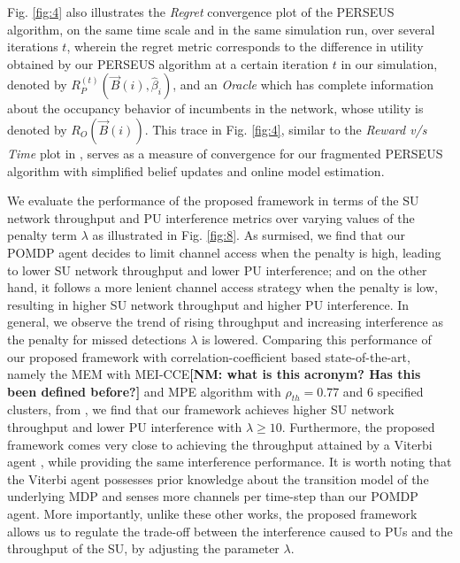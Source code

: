 \documentclass[10pt,twocolumn]{IEEEtran}
\newcommand{\nm}[1]{{\color{blue}\bf{[NM: #1]}}}
\begin{document}
Fig. \ref{fig:4} also illustrates the \emph{Regret} convergence plot of the PERSEUS algorithm, on the same time scale and in the same simulation run, over several iterations $t$, wherein the regret metric corresponds to the difference in utility obtained by our PERSEUS algorithm at a certain iteration $t$ in our simulation, denoted by $R_{P}^{(t)}(\vec{B}(i), \hat{\beta}_{i})$, and an \emph{Oracle} which has complete information about the occupancy behavior of incumbents in the network, whose utility is denoted by $R_{O}(\vec{B}(i))$. This trace in Fig. \ref{fig:4}, similar to the \emph{Reward v/s Time} plot in \cite{DBLP:journals/corr/abs-1109-2145}, serves as a measure of convergence for our fragmented PERSEUS algorithm with simplified belief updates and online model estimation.

We evaluate the performance of the proposed framework in terms of the SU network throughput and PU interference metrics over varying values of the penalty term $\lambda$ as illustrated in Fig. \ref{fig:8}. As surmised, we find that our POMDP agent decides to limit channel access when the penalty is high, leading to lower SU network throughput and lower PU interference; and on the other hand, it follows a more lenient channel access strategy when the penalty is low, resulting in higher SU network throughput and higher PU interference. In general, we observe the trend of rising throughput and increasing interference as the penalty for missed detections $\lambda$ is lowered. Comparing this performance of our proposed framework with correlation-coefficient based state-of-the-art, namely the MEM with MEI-CCE\nm{what is this acronym? Has this been defined before?} and MPE algorithm with $\rho_{th}{=}0.77$ and $6$ specified clusters, from \cite{6956794}, we find that our framework achieves higher SU network throughput and lower PU interference with $\lambda{\geq}10$. Furthermore, the proposed framework comes very close to achieving the throughput attained by a Viterbi agent \cite{4554696}, while providing the same interference performance. It is worth noting that the Viterbi agent possesses prior knowledge about the transition model of the underlying MDP and senses more channels per time-step than our POMDP agent. More importantly, unlike these other works, the proposed framework allows us to regulate the trade-off between the interference caused to PUs and the throughput of the SU, by adjusting the parameter $\lambda$.
\vspace{-4mm}
\end{document}
